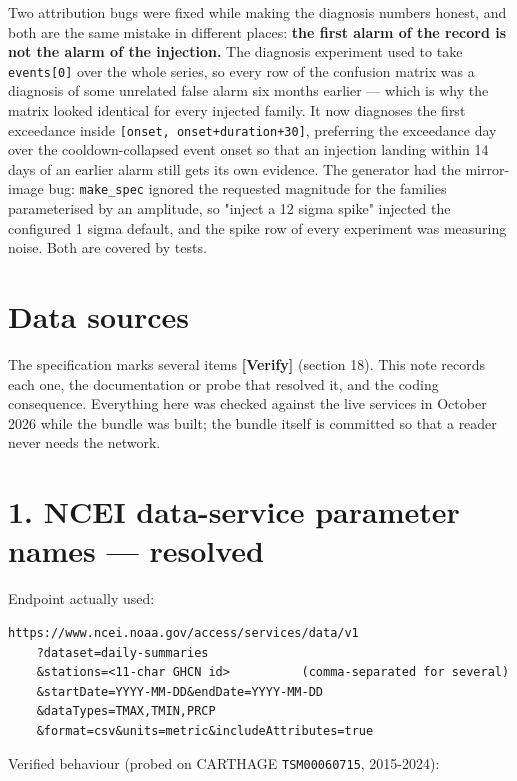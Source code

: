 \documentclass[10pt,a4paper]{article}
\begin{document}
Two attribution bugs were fixed while making the diagnosis numbers honest, and both are the same mistake in different places: \textbf{the first alarm of the record is not the alarm of the injection.}  The diagnosis experiment used to take \texttt{events[0]} over the whole series, so every row of the confusion matrix was a diagnosis of some unrelated false alarm six months earlier — which is why the matrix looked identical for every injected family.  It now diagnoses the first exceedance inside \texttt{[onset, onset+duration+30]}, preferring the exceedance day over the cooldown-\allowbreak{}collapsed event onset so that an injection landing within 14 days of an earlier alarm still gets its own evidence.  The generator had the mirror-\allowbreak{}image bug: \texttt{make\_\allowbreak{}spec} ignored the requested magnitude for the families parameterised by an amplitude, so "inject a 12 sigma spike" injected the configured 1 sigma default, and the spike row of every experiment was measuring noise.  Both are covered by tests.

\clearpage
\section*{Data sources}
The specification marks several items \textbf{[Verify]} (section 18). This note records each one, the documentation or probe that resolved it, and the coding consequence. Everything here was checked against the live services in October 2026 while the bundle was built; the bundle itself is committed so that a reader never needs the network.

\section*{1. NCEI data-\allowbreak{}service parameter names — resolved}
Endpoint actually used:

\begin{Verbatim}[breaklines=true,breakanywhere=true,fontsize=\footnotesize,frame=none,numbers=none]
https://www.ncei.noaa.gov/access/services/data/v1
    ?dataset=daily-summaries
    &stations=<11-char GHCN id>          (comma-separated for several)
    &startDate=YYYY-MM-DD&endDate=YYYY-MM-DD
    &dataTypes=TMAX,TMIN,PRCP
    &format=csv&units=metric&includeAttributes=true
\end{Verbatim}

Verified behaviour (probed on CARTHAGE \texttt{TSM00060715}, 2015-\allowbreak{}2024):
\end{document}
